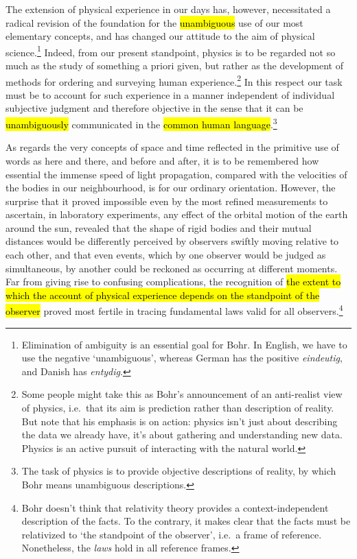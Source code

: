 \documentclass{tufte-handout}
\begin{document}
The extension of physical experience in our days has, however,
necessitated a radical revision of the foundation for the
\hl{unambiguous} use of our most elementary concepts, and has changed
our attitude to the aim of physical science.\footnote{Elimination of
  ambiguity is an essential goal for Bohr. In English, we have to use
  the negative `unambiguous', whereas German has the positive
  \emph{eindeutig}, and Danish has \emph{entydig}.} Indeed, from our
present standpoint, physics is to be regarded not so much as the study
of something a priori given, but rather as the development of methods
for ordering and surveying human experience.\footnote{Some people
  might take this as Bohr's announcement of an anti-realist view of
  physics, i.e.\ that its aim is prediction rather than description of
  reality. But note that his emphasis is on action: physics isn't just
  about describing the data we already have, it's about gathering and
  understanding new data. Physics is an active pursuit of interacting
  with the natural world.} In this respect our task must be to account
for such experience in a manner independent of individual subjective
judgment and therefore objective in the sense that it can be
\hl{unambiguously} communicated in the \hl{common human
  language}.\footnote{The task of physics is to provide objective
  descriptions of reality, by which Bohr means unambiguous
  descriptions.}

As regards the very concepts of space and time reflected in the
primitive use of words as here and there, and before and after, it is
to be remembered how essential the immense speed of light propagation,
compared with the velocities of the bodies in our neighbourhood, is
for our ordinary orientation. However, the surprise that it proved
impossible even by the most refined measurements to ascertain, in
laboratory experiments, any effect of the orbital motion of the earth
around the sun, revealed that the shape of rigid bodies and their
mutual distances would be differently perceived by observers swiftly
moving relative to each other, and that even events, which by one
observer would be judged as simultaneous, by another could be reckoned
as occurring at different moments. Far from giving rise to confusing
complications, the recognition of \hl{the extent to which the account
  of physical experience depends on the standpoint of the observer}
proved most fertile in tracing fundamental laws valid for all
observers.\footnote{Bohr doesn't think that relativity theory provides
  a context-independent description of the facts. To the contrary, it
  makes clear that the facts must be relativized to `the standpoint of
  the observer', i.e.\ a frame of reference. Nonetheless, the
  \emph{laws} hold in all reference frames.}
\end{document}
